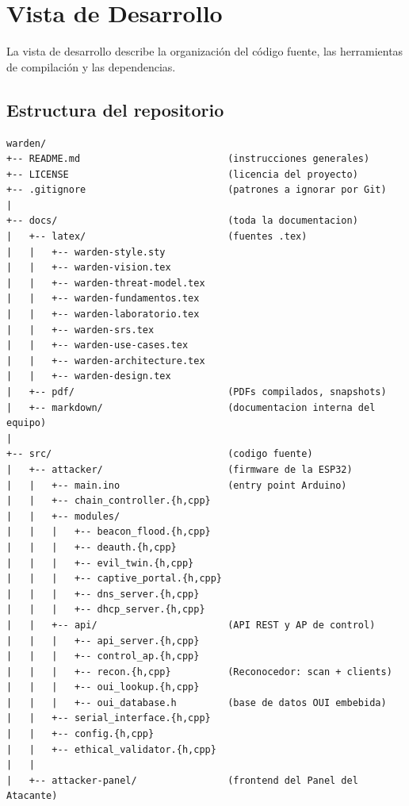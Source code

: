 \documentclass[11pt,a4paper]{article}
\begin{document}
\section{Vista de Desarrollo}

La vista de desarrollo describe la organización del código fuente, las
herramientas de compilación y las dependencias.

\subsection{Estructura del repositorio}

\vspace{0.3cm}
\begin{verbatim}
warden/
+-- README.md                          (instrucciones generales)
+-- LICENSE                            (licencia del proyecto)
+-- .gitignore                         (patrones a ignorar por Git)
|
+-- docs/                              (toda la documentacion)
|   +-- latex/                         (fuentes .tex)
|   |   +-- warden-style.sty
|   |   +-- warden-vision.tex
|   |   +-- warden-threat-model.tex
|   |   +-- warden-fundamentos.tex
|   |   +-- warden-laboratorio.tex
|   |   +-- warden-srs.tex
|   |   +-- warden-use-cases.tex
|   |   +-- warden-architecture.tex
|   |   +-- warden-design.tex
|   +-- pdf/                           (PDFs compilados, snapshots)
|   +-- markdown/                      (documentacion interna del equipo)
|
+-- src/                               (codigo fuente)
|   +-- attacker/                      (firmware de la ESP32)
|   |   +-- main.ino                   (entry point Arduino)
|   |   +-- chain_controller.{h,cpp}
|   |   +-- modules/
|   |   |   +-- beacon_flood.{h,cpp}
|   |   |   +-- deauth.{h,cpp}
|   |   |   +-- evil_twin.{h,cpp}
|   |   |   +-- captive_portal.{h,cpp}
|   |   |   +-- dns_server.{h,cpp}
|   |   |   +-- dhcp_server.{h,cpp}
|   |   +-- api/                       (API REST y AP de control)
|   |   |   +-- api_server.{h,cpp}
|   |   |   +-- control_ap.{h,cpp}
|   |   |   +-- recon.{h,cpp}          (Reconocedor: scan + clients)
|   |   |   +-- oui_lookup.{h,cpp}
|   |   |   +-- oui_database.h         (base de datos OUI embebida)
|   |   +-- serial_interface.{h,cpp}
|   |   +-- config.{h,cpp}
|   |   +-- ethical_validator.{h,cpp}
|   |
|   +-- attacker-panel/                (frontend del Panel del Atacante)

\end{verbatim}
\end{document}
